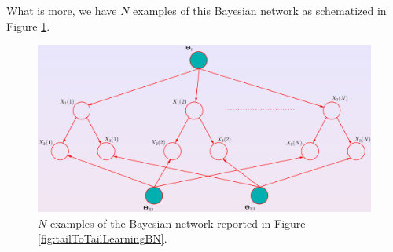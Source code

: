 What is more, we have $N$ examples of this Bayesian network as schematized in Figure \ref{fig:learningBNExample1}. 

\begin{figure}[h]
    \centering
    \includegraphics[width=\textwidth]{images/learningBNExample1.png}
    \caption{$N$ examples of the Bayesian network reported in Figure \ref{fig:tailToTailLearningBN}.}
    \label{fig:learningBNExample1}
\end{figure}

